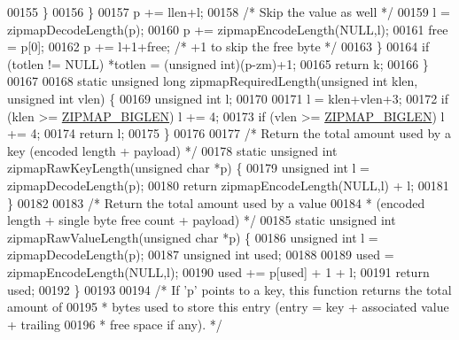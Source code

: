 \begin{DoxyCode}
00155             \}
00156         \}
00157         p += llen+l;
00158         \textcolor{comment}{/* Skip the value as well */}
00159         l = zipmapDecodeLength(p);
00160         p += zipmapEncodeLength(NULL,l);
00161         free = p[0];
00162         p += l+1+free; \textcolor{comment}{/* +1 to skip the free byte */}
00163     \}
00164     \textcolor{keywordflow}{if} (totlen != NULL) *totlen = (\textcolor{keywordtype}{unsigned} \textcolor{keywordtype}{int})(p-zm)+1;
00165     \textcolor{keywordflow}{return} k;
00166 \}
00167 
00168 \textcolor{keyword}{static} \textcolor{keywordtype}{unsigned} \textcolor{keywordtype}{long} zipmapRequiredLength(\textcolor{keywordtype}{unsigned} \textcolor{keywordtype}{int} klen, \textcolor{keywordtype}{unsigned} \textcolor{keywordtype}{int} vlen) \{
00169     \textcolor{keywordtype}{unsigned} \textcolor{keywordtype}{int} l;
00170 
00171     l = klen+vlen+3;
00172     \textcolor{keywordflow}{if} (klen >= \hyperlink{zipmap_8c_a1173592dbfaa84c6b2419d0a699c97f5}{ZIPMAP\_BIGLEN}) l += 4;
00173     \textcolor{keywordflow}{if} (vlen >= \hyperlink{zipmap_8c_a1173592dbfaa84c6b2419d0a699c97f5}{ZIPMAP\_BIGLEN}) l += 4;
00174     \textcolor{keywordflow}{return} l;
00175 \}
00176 
00177 \textcolor{comment}{/* Return the total amount used by a key (encoded length + payload) */}
00178 \textcolor{keyword}{static} \textcolor{keywordtype}{unsigned} \textcolor{keywordtype}{int} zipmapRawKeyLength(\textcolor{keywordtype}{unsigned} \textcolor{keywordtype}{char} *p) \{
00179     \textcolor{keywordtype}{unsigned} \textcolor{keywordtype}{int} l = zipmapDecodeLength(p);
00180     \textcolor{keywordflow}{return} zipmapEncodeLength(NULL,l) + l;
00181 \}
00182 
00183 \textcolor{comment}{/* Return the total amount used by a value}
00184 \textcolor{comment}{ * (encoded length + single byte free count + payload) */}
00185 \textcolor{keyword}{static} \textcolor{keywordtype}{unsigned} \textcolor{keywordtype}{int} zipmapRawValueLength(\textcolor{keywordtype}{unsigned} \textcolor{keywordtype}{char} *p) \{
00186     \textcolor{keywordtype}{unsigned} \textcolor{keywordtype}{int} l = zipmapDecodeLength(p);
00187     \textcolor{keywordtype}{unsigned} \textcolor{keywordtype}{int} used;
00188 
00189     used = zipmapEncodeLength(NULL,l);
00190     used += p[used] + 1 + l;
00191     \textcolor{keywordflow}{return} used;
00192 \}
00193 
00194 \textcolor{comment}{/* If 'p' points to a key, this function returns the total amount of}
00195 \textcolor{comment}{ * bytes used to store this entry (entry = key + associated value + trailing}
00196 \textcolor{comment}{ * free space if any). */}

\end{DoxyCode}
